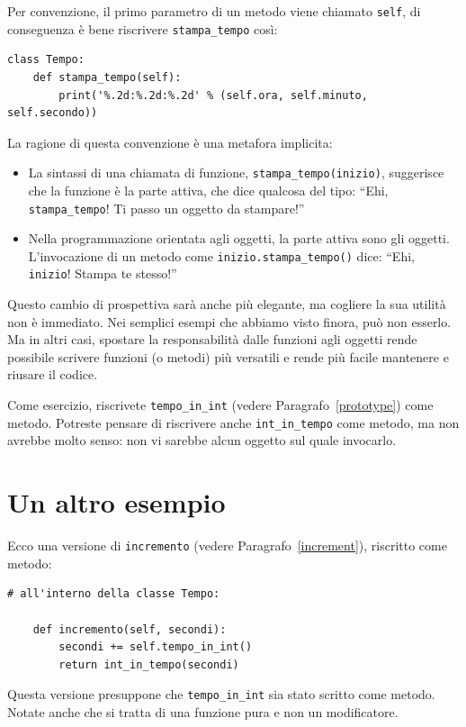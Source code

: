 \documentclass[10pt]{book}
\begin{document}
Per convenzione, il primo parametro di un metodo viene chiamato {\tt self}, di conseguenza è bene riscrivere \verb"stampa_tempo" così:

\begin{verbatim}
class Tempo:
    def stampa_tempo(self):
        print('%.2d:%.2d:%.2d' % (self.ora, self.minuto, self.secondo))
\end{verbatim}
%
La ragione di questa convenzione è una metafora implicita:

\begin{itemize}

\item La sintassi di una chiamata di funzione, \verb"stampa_tempo(inizio)",
  suggerisce che la funzione è la parte attiva, che dice qualcosa del tipo: ``Ehi, \verb"stampa_tempo"!  Ti passo un oggetto da stampare!''

\item Nella programmazione orientata agli oggetti, la parte attiva sono gli oggetti.  L'invocazione di un metodo come \verb"inizio.stampa_tempo()" dice:
  ``Ehi, {\tt inizio}!  Stampa te stesso!''

\end{itemize}

Questo cambio di prospettiva sarà anche più elegante, ma cogliere la sua utilità non è immediato. Nei semplici esempi che abbiamo visto finora, può non esserlo. Ma in altri casi, spostare la responsabilità dalle funzioni agli oggetti rende possibile scrivere funzioni (o metodi) più versatili e rende più facile mantenere e riusare il codice.

Come esercizio, riscrivete \verb"tempo_in_int" (vedere Paragrafo~\ref{prototype}) come metodo.
Potreste pensare di riscrivere anche \verb"int_in_tempo" come metodo, ma non avrebbe molto senso: non vi sarebbe alcun oggetto sul quale invocarlo.



\section{Un altro esempio}

Ecco una versione di {\tt incremento} (vedere Paragrafo~\ref{increment}),
riscritto come metodo:

\begin{verbatim}
# all'interno della classe Tempo:

    def incremento(self, secondi):
        secondi += self.tempo_in_int()
        return int_in_tempo(secondi)
\end{verbatim}
%
Questa versione presuppone che \verb"tempo_in_int" sia stato scritto come metodo.  Notate anche che si tratta di una funzione pura e non un modificatore.
\end{document}
